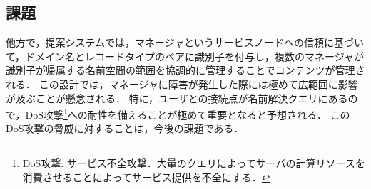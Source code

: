 \subsection{課題}
他方で，提案システムでは，マネージャというサービスノードへの信頼に基づいて，ドメイン名とレコードタイプのペアに識別子を付与し，複数のマネージャが識別子が帰属する名前空間の範囲を協調的に管理することでコンテンツが管理される．
この設計では，マネージャに障害が発生した際には極めて広範囲に影響が及ぶことが懸念される．
特に，ユーザとの接続点が名前解決クエリにあるので，DoS攻撃\footnote{DoS攻撃: サービス不全攻撃．大量のクエリによってサーバの計算リソースを消費させることによってサービス提供を不全にする．}への耐性を備えることが極めて重要となると予想される．
このDoS攻撃の脅威に対することは，今後の課題である．


